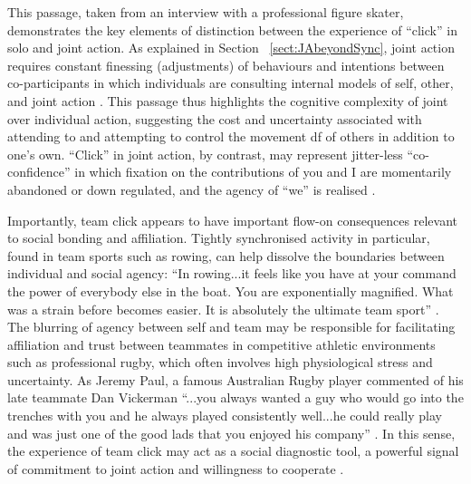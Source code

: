 \begin{CJK}{UTF8}{gbsn}
    This passage, taken from an interview with a professional figure skater, demonstrates the key elements of distinction between the experience of ``click'' in solo and joint action.  As explained in Section ~\ref{sect:JAbeyondSync}, joint action requires constant finessing (adjustments) of behaviours and intentions between co-participants in which individuals are consulting internal models of self, other, and joint action \citep{Pesquita2017}. This passage thus highlights the cognitive complexity of joint over individual action, suggesting the cost and uncertainty associated with attending to and attempting to control the movement df of others in addition to one's own.  ``Click'' in joint action, by contrast, may represent jitter-less ``co-confidence'' in which fixation on the contributions of you and I are momentarily abandoned or down regulated, and the agency of ``we'' is realised \citep{Gallotti2013,Noy2017}.

    Importantly, team click appears to have important flow-on consequences relevant to social bonding and affiliation. Tightly synchronised activity in particular, found in team sports such as rowing, can help dissolve the boundaries between individual and social agency: ``In rowing...it feels like you have at your command the power of everybody else in the boat. You are exponentially magnified. What was a strain before becomes easier. It is absolutely the ultimate team sport'' \citep{Brown2016}.
    The blurring of agency between self and team may be responsible for facilitating affiliation and trust between teammates in competitive athletic environments such as professional rugby, which often involves high physiological stress and uncertainty.  As Jeremy Paul, a famous Australian Rugby player commented of his late teammate Dan Vickerman ``...you always wanted a guy who would go into the trenches with you and he always played consistently well...he could really play and was just one of the good lads that you enjoyed his company'' \citep{Fox-Sports2017}.  In this sense, the experience of team click may act as a social diagnostic tool, a powerful signal of commitment to joint action and willingness to cooperate \citep{Reddish2013a}. \\
    \\
    \\


\end{CJK}
